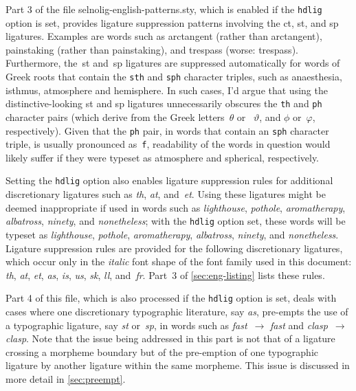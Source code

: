 \documentclass[11pt]{article}
\newcommand{\pkg}[1]{\textsf{#1}}
\newcommand{\opt}[1]{\texttt{#1}}
\begin{document}
Part 3 of the file \pkg{selnolig-english-patterns.sty}, which is enabled if the \opt{hdlig} option is set, provides ligature suppression patterns involving the \mbox{ct}, \mbox{st}, and \mbox{sp} ligatures. Examples are words such as arctangent (rather than ar\mbox{ct}angent), painstaking (rather than pain\mbox{st}aking), and trespass (worse: tre\mbox{sp}ass). Furthermore, the~st and~sp ligatures are suppressed automatically for words of Greek roots that contain the \opt{sth} and \opt{sph} character triples, such as anaesthesia, isthmus, atmosphere and hemisphere. In such cases, I'd argue that using the distinctive-looking st and sp ligatures unnecessarily obscures the \opt{th} and \opt{ph} character pairs (which derive from the Greek letters~$\theta$ or ~$\vartheta$, and $\phi$ or~$\varphi$, respectively). Given that the \opt{ph} pair, in words that contain an \opt{sph} character triple, is usually pronounced as~\opt{f}, readability of the words in question would likely suffer if they were typeset as atmo\mbox{sp}here and \mbox{sp}herical, respectively.

Setting the \opt{hdlig} option also enables ligature suppression rules for additional discretionary ligatures such as \emph{th}, \emph{at}, and~\emph{et}. Using these ligatures might be deemed inappropriate if used in words such as \emph{ligh\mbox{th}ouse}, \emph{po\mbox{th}ole}, \emph{arom\mbox{at}herapy}, \emph{alb\mbox{at}ross}, \emph{nin\mbox{et}y}, and \emph{non\mbox{et}heless}; with the \opt{hdlig} option set, these words will be typeset as \emph{lighthouse}, \emph{pothole}, \emph{aromatherapy}, \emph{albatross}, \emph{ninety}, and \emph{nonetheless}. Ligature suppression rules are provided for the following discretionary ligatures, which occur only in the \emph{italic} font shape of the font family used in this document: \emph{th}, \emph{at}, \emph{et}, \emph{as}, \emph{is}, \emph{us}, {\ebg \emph{sk}}, \emph{ll}, and~\emph{fr}. Part~3 of \cref{sec:eng-listing} lists these rules.

Part 4 of this file, which is also processed if the \opt{hdlig} option is set, deals with cases where one discretionary typographic literature, say \emph{as}, pre-empts the use of a typographic ligature, say \emph{st} or~\emph{sp}, in words such as \emph{f\mbox{as}t}~$\to$ \emph{fa\mbox{st}} and \emph{cl\mbox{as}p}~$\to$ \emph{cla\mbox{sp}}. Note that the issue being addressed in this part is not that of a ligature crossing a morpheme boundary but of the pre-emption of one typographic ligature by another ligature within the same morpheme. This issue is discussed in more detail in \cref{sec:preempt}.
\end{document}
